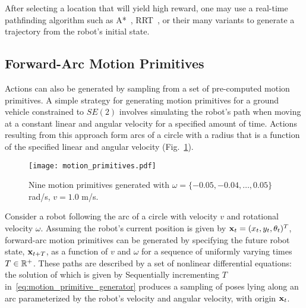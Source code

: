 After selecting a location that will yield high reward,
one may use a real-time pathfinding algorithm such as A*~\cite{hart1968formal},
RRT~\cite{lavalle1998rapidly}, or their many variants to generate a trajectory from
the robot's initial state.

\subsection{Forward-Arc Motion Primitives}
\label{subsec:fa_motion_primitives}

Actions can also be generated by sampling from a set of
pre-computed motion primitives. A simple strategy for generating motion
primitives for a ground vehicle constrained to $SE(2)$ involves
simulating the robot's path when moving at a constant linear and angular
velocity for a specified amount of time.
Actions resulting from this approach form arcs of a circle with a radius that is a
function of the specified linear and angular velocity (Fig.~\ref{fig:motion_prims}).
%
\begin{figure}[hb]
  \centering
  \texttt{[image: motion\_primitives.pdf]}
  \caption[A forward-arc motion primitive dictionary.]{Nine motion primitives generated with $\omega = \{-0.05, -0.04,
  \dots, 0.05\}$ rad/s, $v = 1.0$ m/s.\label{fig:motion_prims}}
\end{figure}

Consider a robot following the arc of a
circle with velocity $v$ and rotational velocity $\omega$. Assuming the robot's
current position is given by $\mathbf{x}_t=(x_t,y_t,\theta_t)^T$, forward-arc motion primitives
can be generated by specifying the future robot state, $\mathbf{x}_{t+T}$,
as a function of $v$ and $\omega$ for a sequence of uniformly varying
times $T \in {\mathbb{R}}^{+}$. These paths are described
by a set of nonlinear differential equations:
%
%
the solution of which is given by
%
%
Sequentially incrementing $T$ in~\eqref{eq:motion_primitive_generator}
produces a sampling of poses lying along an arc
parameterized by the robot's velocity and angular velocity, with origin $\mathbf{x}_{t}$.

